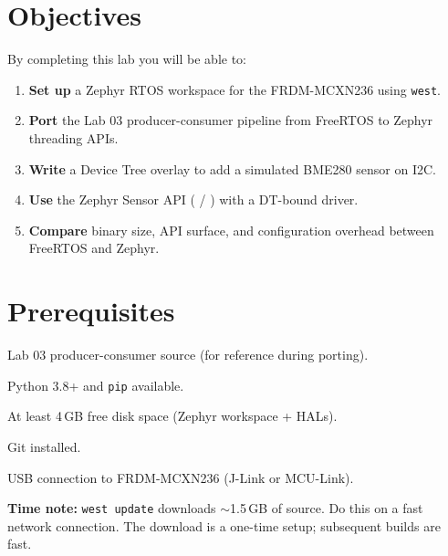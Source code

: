 \documentclass[11pt, a4paper]{article}
\begin{document}

\section{Objectives}

By completing this lab you will be able to:

\begin{enumerate}[noitemsep, leftmargin=*]
  \item \textbf{Set up} a Zephyr RTOS workspace for the FRDM-MCXN236 using \texttt{west}.
  \item \textbf{Port} the Lab 03 producer-consumer pipeline from FreeRTOS to Zephyr
        threading APIs.
  \item \textbf{Write} a Device Tree overlay to add a simulated BME280 sensor on I2C.
  \item \textbf{Use} the Zephyr Sensor API ( /
        ) with a DT-bound driver.
  \item \textbf{Compare} binary size, API surface, and configuration overhead between
        FreeRTOS and Zephyr.
\end{enumerate}

\section{Prerequisites}

\begin{checklist}
  \item Lab 03 producer-consumer source (for reference during porting).
  \item Python 3.8+ and \texttt{pip} available.
  \item At least 4\,GB free disk space (Zephyr workspace + HALs).
  \item Git installed.
  \item USB connection to FRDM-MCXN236 (J-Link or MCU-Link).
\end{checklist}

\begin{warnbox}
  \textbf{Time note:} \texttt{west update} downloads $\sim$1.5\,GB of source. Do this
  on a fast network connection. The download is a one-time setup; subsequent builds are
  fast.
\end{warnbox}
\end{document}

